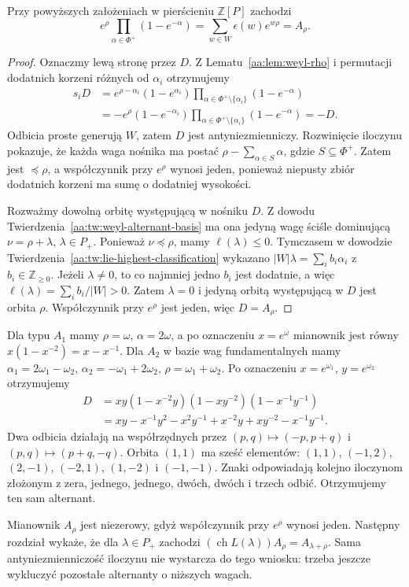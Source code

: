 \begin{twierdzenie}
\label{aa:tw:weyl-denominator}
Przy powyższych założeniach w pierścieniu $\mathbb Z[P]$ zachodzi
\[
 e^\rho\prod_{\alpha\in\Phi^+}(1-e^{-\alpha})
 =\sum_{w\in W}\epsilon(w)e^{w\rho}=A_\rho.
\]
\end{twierdzenie}
\begin{proof}
Oznaczmy lewą stronę przez $D$. Z Lematu~\ref{aa:lem:weyl-rho} i permutacji dodatnich korzeni różnych od $\alpha_i$ otrzymujemy
\[
 \begin{aligned}
 s_iD&=e^{\rho-\alpha_i}(1-e^{\alpha_i})
       \prod_{\alpha\in\Phi^+\setminus\{\alpha_i\}}(1-e^{-\alpha})\\
 &=-e^\rho(1-e^{-\alpha_i})
       \prod_{\alpha\in\Phi^+\setminus\{\alpha_i\}}(1-e^{-\alpha})=-D.
 \end{aligned}
\]
Odbicia proste generują $W$, zatem $D$ jest antyniezmienniczy. Rozwinięcie iloczynu pokazuje, że każda waga nośnika ma postać $\rho-\sum_{\alpha\in S}\alpha$, gdzie $S\subseteq\Phi^+$. Zatem jest $\preceq\rho$, a współczynnik przy $e^\rho$ wynosi jeden, ponieważ niepusty zbiór dodatnich korzeni ma sumę o dodatniej wysokości.

Rozważmy dowolną orbitę występującą w nośniku $D$. Z dowodu Twierdzenia~\ref{aa:tw:weyl-alternant-basis} ma ona jedyną wagę ściśle dominującą $\nu=\rho+\lambda$, $\lambda\in P_+$. Ponieważ $\nu\preceq\rho$, mamy $\ell(\lambda)\le0$. Tymczasem w dowodzie Twierdzenia~\ref{aa:tw:lie-highest-classification} wykazano $|W|\lambda=\sum_i b_i\alpha_i$ z $b_i\in\mathbb Z_{\ge0}$. Jeżeli $\lambda\ne0$, to co najmniej jedno $b_i$ jest dodatnie, a więc $\ell(\lambda)=\sum_i b_i/|W|>0$. Zatem $\lambda=0$ i jedyną orbitą występującą w $D$ jest orbita $\rho$. Współczynnik przy $e^\rho$ jest jeden, więc $D=A_\rho$.
\end{proof}

\begin{przyklad}[Typy $A_1$ i $A_2$]
\label{aa:prz:weyl-denominator-small}
Dla typu $A_1$ mamy $\rho=\omega$, $\alpha=2\omega$, a po oznaczeniu $x=e^\omega$ mianownik jest równy $x(1-x^{-2})=x-x^{-1}$. Dla $A_2$ w bazie wag fundamentalnych mamy $\alpha_1=2\omega_1-\omega_2$, $\alpha_2=-\omega_1+2\omega_2$, $\rho=\omega_1+\omega_2$. Po oznaczeniu $x=e^{\omega_1}$, $y=e^{\omega_2}$ otrzymujemy
\[
 \begin{aligned}
 D&=xy(1-x^{-2}y)(1-xy^{-2})(1-x^{-1}y^{-1})\\
 &=xy-x^{-1}y^2-x^2y^{-1}+x^{-2}y+xy^{-2}-x^{-1}y^{-1}.
 \end{aligned}
\]
Dwa odbicia działają na współrzędnych przez $(p,q)\mapsto(-p,p+q)$ i $(p,q)\mapsto(p+q,-q)$. Orbita $(1,1)$ ma sześć elementów: $(1,1)$, $(-1,2)$, $(2,-1)$, $(-2,1)$, $(1,-2)$ i $(-1,-1)$. Znaki odpowiadają kolejno iloczynom złożonym z zera, jednego, jednego, dwóch, dwóch i trzech odbić. Otrzymujemy ten sam alternant.
\end{przyklad}

Mianownik $A_\rho$ jest niezerowy, gdyż współczynnik przy $e^\rho$ wynosi jeden. Następny rozdział wykaże, że dla $\lambda\in P_+$ zachodzi $(\operatorname{ch}L(\lambda))A_\rho=A_{\lambda+\rho}$. Sama antyniezmienniczość iloczynu nie wystarcza do tego wniosku: trzeba jeszcze wykluczyć pozostałe alternanty o niższych wagach.
